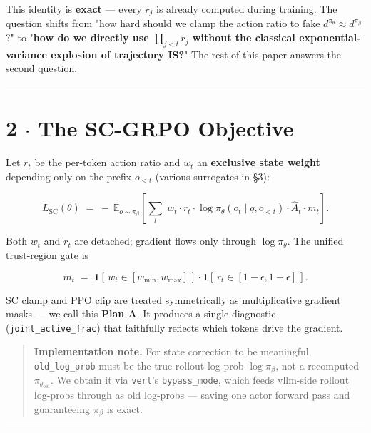 \documentclass[11pt,a4paper]{article}
\theoremstyle{remark}
\begin{document}
This identity is \textbf{exact} --- every $r_j$ is already computed during training. The question shifts from "how hard should we clamp the action ratio to fake $d^{\pi_\theta}\approx d^{\pi_\beta}$?" to "\textbf{how do we directly use $\prod_{j<t} r_j$ without the classical exponential-variance explosion of trajectory IS?}" The rest of this paper answers the second question.

\vspace{0.5em}\hrule\vspace{0.5em}
\section*{2 $\cdot$ The SC-GRPO Objective}

Let $r_t$ be the per-token action ratio and $w_t$ an \textbf{exclusive state weight} depending only on the prefix $o_{<t}$ (various surrogates in §3):


\begin{equation*}
\boxed{\;L_{\text{SC}}(\theta) \;=\; -\,\mathbb{E}_{o\sim \pi_\beta}\!\left[\sum_t \; w_t\cdot r_t\cdot \log\pi_\theta(o_t\mid q, o_{<t})\cdot \hat A_t\cdot m_t\right].\;}
\end{equation*}


Both $w_t$ and $r_t$ are detached; gradient flows only through $\log\pi_\theta$. The unified trust-region gate is


\begin{equation*}
m_t \;=\; \mathbf 1[\,w_t\in [w_{\min}, w_{\max}]\,]\cdot \mathbf 1[\,r_t\in[1-\epsilon,1+\epsilon]\,].
\end{equation*}


SC clamp and PPO clip are treated symmetrically as multiplicative gradient masks --- we call this \textbf{Plan A}. It produces a single diagnostic (\texttt{joint\_active\_frac}) that faithfully reflects which tokens drive the gradient.

\begin{quote}
\textbf{Implementation note.} For state correction to be meaningful, \texttt{old\_log\_prob} must be the true rollout log-prob $\log\pi_\beta$, not a recomputed $\pi_{\theta_{\text{old}}}$. We obtain it via \texttt{verl}'s \texttt{bypass\_mode}, which feeds vllm-side rollout log-probs through as old log-probs --- saving one actor forward pass and guaranteeing $\pi_\beta$ is exact.

\end{quote}
\vspace{0.5em}\hrule\vspace{0.5em}
\end{document}
